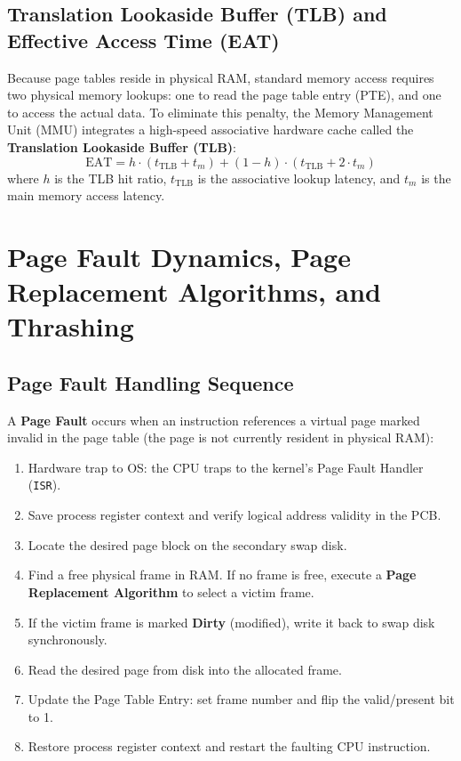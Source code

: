 \subsection{Translation Lookaside Buffer (TLB) and Effective Access Time (EAT)}
Because page tables reside in physical RAM, standard memory access requires two physical memory lookups: one to read the page table entry (PTE), and one to access the actual data. To eliminate this penalty, the Memory Management Unit (MMU) integrates a high-speed associative hardware cache called the \textbf{Translation Lookaside Buffer (TLB)}:
\begin{equation}
\boxed{\text{EAT} = h \cdot (t_{\text{TLB}} + t_m) + (1 - h) \cdot (t_{\text{TLB}} + 2 \cdot t_m)}
\end{equation}
where $h$ is the TLB hit ratio, $t_{\text{TLB}}$ is the associative lookup latency, and $t_m$ is the main memory access latency.

\section{Page Fault Dynamics, Page Replacement Algorithms, and Thrashing}
\label{sec:os_page_faults_thrashing}

\subsection{Page Fault Handling Sequence}
A \textbf{Page Fault} occurs when an instruction references a virtual page marked invalid in the page table (the page is not currently resident in physical RAM):
\begin{enumerate}
    \item Hardware trap to OS: the CPU traps to the kernel's Page Fault Handler (\texttt{ISR}).
    \item Save process register context and verify logical address validity in the PCB.
    \item Locate the desired page block on the secondary swap disk.
    \item Find a free physical frame in RAM. If no frame is free, execute a \textbf{Page Replacement Algorithm} to select a victim frame.
    \item If the victim frame is marked \textbf{Dirty} (modified), write it back to swap disk synchronously.
    \item Read the desired page from disk into the allocated frame.
    \item Update the Page Table Entry: set frame number and flip the valid/present bit to 1.
    \item Restore process register context and restart the faulting CPU instruction.
\end{enumerate}

